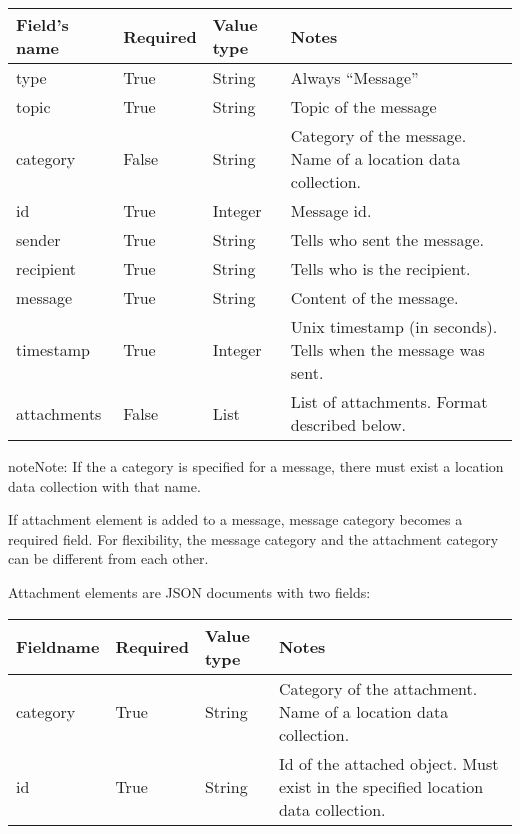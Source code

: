 \documentclass[letterpaper,10pt,english]{sphinxmanual}
\begin{document}
\begin{tabulary}{\linewidth}{|L|L|L|L|}
\hline
\textsf{\relax 
Field's name
} & \textsf{\relax 
Required
} & \textsf{\relax 
Value type
} & \textsf{\relax 
Notes
}\\
\hline
type
 & 
True
 & 
String
 & 
Always ``Message''
\\

topic
 & 
True
 & 
String
 & 
Topic of the message
\\

category
 & 
False
 & 
String
 & 
Category of the message. Name of a location data collection.
\\

id
 & 
True
 & 
Integer
 & 
Message id.
\\

sender
 & 
True
 & 
String
 & 
Tells who sent the message.
\\

recipient
 & 
True
 & 
String
 & 
Tells who is the recipient.
\\

message
 & 
True
 & 
String
 & 
Content of the message.
\\

timestamp
 & 
True
 & 
Integer
 & 
Unix timestamp (in seconds). Tells when the message was sent.
\\

attachments
 & 
False
 & 
List
 & 
List of attachments. Format described below.
\\
\hline\end{tabulary}


\begin{notice}{note}{Note:}
If the a category is specified for a message, there must exist a location data collection with that name.
\end{notice}

If attachment element is added to a message, message category becomes a required field. For flexibility, the message category
and the attachment category can be different from each other.

Attachment elements are JSON documents with two fields:

\begin{tabulary}{\linewidth}{|L|L|L|L|}
\hline
\textsf{\relax 
Fieldname
} & \textsf{\relax 
Required
} & \textsf{\relax 
Value type
} & \textsf{\relax 
Notes
}\\
\hline
category
 & 
True
 & 
String
 & 
Category of the attachment. Name of a location data collection.
\\

id
 & 
True
 & 
String
 & 
Id of the attached object. Must exist in the specified location data collection.
\\
\hline\end{tabulary}
\end{document}

